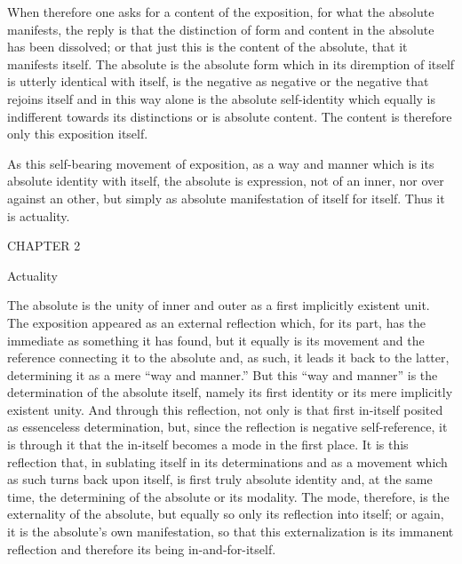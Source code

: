 When therefore one asks for a content of the exposition,
for what the absolute manifests,
the reply is that the distinction of form and content
in the absolute has been dissolved;
or that just this is the content of the absolute,
that it manifests itself.
The absolute is the absolute form
which in its diremption of itself is
utterly identical with itself,
is the negative as negative
or the negative that rejoins itself
and in this way alone is the absolute self-identity
which equally is indifferent towards its distinctions
or is absolute content.
The content is therefore only this exposition itself.

As this self-bearing movement of exposition,
as a way and manner which is its absolute identity with itself,
the absolute is expression, not of an inner, nor over against an other,
but simply as absolute manifestation of itself for itself.
Thus it is actuality.

CHAPTER 2

Actuality

The absolute is the unity of inner and outer
as a first implicitly existent unit.
The exposition appeared as an external reflection
which, for its part, has the immediate as something it has found,
but it equally is its movement and
the reference connecting it to the absolute
and, as such, it leads it back to the latter,
determining it as a mere “way and manner.”
But this “way and manner” is the determination of the absolute itself,
namely its first identity or its mere implicitly existent unity.
And through this reflection, not only is that
first in-itself posited as essenceless determination,
but, since the reflection is negative self-reference,
it is through it that the in-itself becomes
a mode in the first place.
It is this reflection that,
in sublating itself in its determinations
and as a movement which as such turns back upon itself,
is first truly absolute identity
and, at the same time, the determining of
the absolute or its modality.
The mode, therefore, is the externality of the absolute,
but equally so only its reflection into itself;
or again, it is the absolute's own manifestation,
so that this externalization is its immanent reflection
and therefore its being in-and-for-itself.

